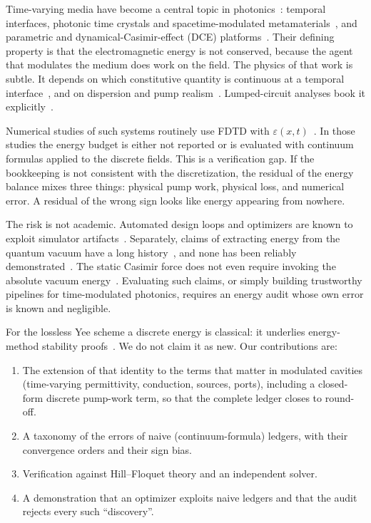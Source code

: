 \documentclass[aps,pre,reprint,superscriptaddress,amsmath,amssymb]{revtex4-2}
\begin{document}
Time-varying media have become a central topic in photonics~\cite{Galiffi2022}:
temporal interfaces, photonic time crystals and spacetime-modulated
metamaterials~\cite{Caloz2020}, and parametric and dynamical-Casimir-effect (DCE)
platforms~\cite{Wilson2011,Dodonov2020}. Their defining property is that the
electromagnetic energy is not conserved, because the agent that modulates the
medium does work on the field. The physics of that work is subtle. It depends on
which constitutive quantity is continuous at a temporal interface~\cite{Galiffi2025},
and on dispersion and pump realism~\cite{Hayran2022}. Lumped-circuit analyses book
it explicitly~\cite{Mirmoosa2019}.

Numerical studies of such systems routinely use FDTD with
$\varepsilon(x,t)$~\cite{Stewart2016,Taravati2024,Sarkar2022,Faccio2011}. In those
studies the energy budget is either not reported or is evaluated with continuum
formulas applied to the discrete fields. This is a verification gap. If the
bookkeeping is not consistent with the discretization, the residual of the energy
balance mixes three things: physical pump work, physical loss, and numerical error.
A residual of the wrong sign looks like energy appearing from nowhere.

The risk is not academic. Automated design loops and optimizers are known to
exploit simulator artifacts~\cite{Lehman2018}. Separately, claims of extracting
energy from the quantum vacuum have a long history~\cite{Forward1984,Cole1993},
and none has been reliably demonstrated~\cite{Moddel2019}. The static Casimir force
does not even require invoking the absolute vacuum energy~\cite{Jaffe2005}.
Evaluating such claims, or simply building trustworthy pipelines for time-modulated
photonics, requires an energy audit whose own error is known and negligible.

For the lossless Yee scheme a discrete energy is classical: it underlies
energy-method stability proofs~\cite{Joly2003,Chen2008,Bekmambetova2016}. We do not
claim it as new. Our contributions are:

\begin{enumerate}
\item The extension of that identity to the terms that matter in modulated cavities
  (time-varying permittivity, conduction, sources, ports), including a closed-form
  discrete pump-work term, so that the complete ledger closes to round-off.
\item A taxonomy of the errors of naive (continuum-formula) ledgers, with their
  convergence orders and their sign bias.
\item Verification against Hill--Floquet theory and an independent solver.
\item A demonstration that an optimizer exploits naive ledgers and that the audit
  rejects every such ``discovery''.
\end{enumerate}
\end{document}
